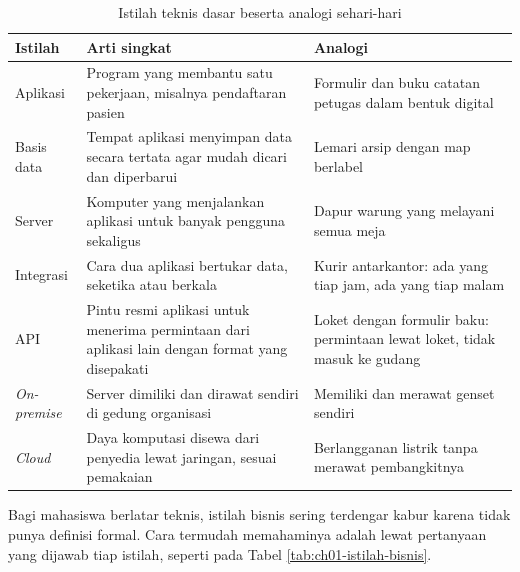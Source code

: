 \begin{table}[!htb]
  \centering
  \caption{Istilah teknis dasar beserta analogi sehari-hari}
  \label{tab:ch01-istilah-teknis}
  \footnotesize
  \begin{tabularx}{\textwidth}{>{\raggedright\arraybackslash}p{1.8cm}
      >{\raggedright\arraybackslash}X >{\raggedright\arraybackslash}X}
    \hline
    \textbf{Istilah} & \textbf{Arti singkat} & \textbf{Analogi} \\
    \hline
    Aplikasi & Program yang membantu satu pekerjaan, misalnya pendaftaran pasien & Formulir dan buku catatan petugas dalam bentuk digital \\
    \hline
    Basis data & Tempat aplikasi menyimpan data secara tertata agar mudah dicari dan diperbarui & Lemari arsip dengan map berlabel \\
    \hline
    Server & Komputer yang menjalankan aplikasi untuk banyak pengguna sekaligus & Dapur warung yang melayani semua meja \\
    \hline
    Integrasi & Cara dua aplikasi bertukar data, seketika atau berkala & Kurir antarkantor: ada yang tiap jam, ada yang tiap malam \\
    \hline
    API & Pintu resmi aplikasi untuk menerima permintaan dari aplikasi lain dengan format yang disepakati & Loket dengan formulir baku: permintaan lewat loket, tidak masuk ke gudang \\
    \hline
    \textit{On-premise} & Server dimiliki dan dirawat sendiri di gedung organisasi & Memiliki dan merawat genset sendiri \\
    \hline
    \textit{Cloud} & Daya komputasi disewa dari penyedia lewat jaringan, sesuai pemakaian & Berlangganan listrik tanpa merawat pembangkitnya \\
    \hline
  \end{tabularx}
\end{table}

Bagi mahasiswa berlatar teknis, istilah bisnis sering terdengar kabur karena
tidak punya definisi formal. Cara termudah memahaminya adalah lewat
pertanyaan yang dijawab tiap istilah, seperti pada Tabel
\ref{tab:ch01-istilah-bisnis}.

